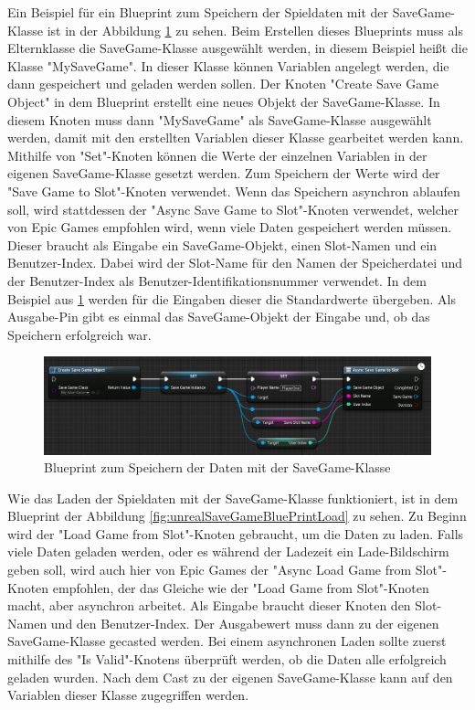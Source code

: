 Ein Beispiel für ein Blueprint zum Speichern der Spieldaten mit der SaveGame-Klasse ist in der Abbildung \ref{fig:unrealSaveGameBluePrintSave} zu sehen. Beim Erstellen dieses Blueprints muss als Elternklasse die SaveGame-Klasse ausgewählt werden, in diesem Beispiel heißt die Klasse "MySaveGame". In dieser Klasse können Variablen angelegt werden, die dann gespeichert und geladen werden sollen. Der Knoten "Create Save Game Object" in dem Blueprint erstellt eine neues Objekt der SaveGame-Klasse. In diesem Knoten muss dann "MySaveGame" als SaveGame-Klasse ausgewählt werden, damit mit den erstellten Variablen dieser Klasse gearbeitet werden kann. Mithilfe von "Set"-Knoten können die Werte der einzelnen Variablen in der eigenen SaveGame-Klasse gesetzt werden. Zum Speichern der Werte wird der "Save Game to Slot"-Knoten verwendet. Wenn das Speichern asynchron ablaufen soll, wird stattdessen der "Async Save Game to Slot"-Knoten verwendet, welcher von Epic Games empfohlen wird, wenn viele Daten gespeichert werden müssen. Dieser braucht als Eingabe ein SaveGame-Objekt, einen Slot-Namen und ein Benutzer-Index. Dabei wird der Slot-Name für den Namen der Speicherdatei und der Benutzer-Index als Benutzer-Identifikationsnummer verwendet. In dem Beispiel aus \ref{fig:unrealSaveGameBluePrintSave} werden für die Eingaben dieser die Standardwerte übergeben. Als Ausgabe-Pin gibt es einmal das SaveGame-Objekt der Eingabe und, ob das Speichern erfolgreich war.\cite{unrealengineSavingLoading}

\begin{figure}[htp]
    \centering
    \includegraphics[width=1\textwidth]{images/SaveGameBP.png}
    \caption{Blueprint zum Speichern der Daten mit der SaveGame-Klasse\cite{unrealengineSavingLoading}}
    \label{fig:unrealSaveGameBluePrintSave}
\end{figure}

Wie das Laden der Spieldaten mit der SaveGame-Klasse funktioniert, ist in dem Blueprint der Abbildung \ref{fig:unrealSaveGameBluePrintLoad} zu sehen. Zu Beginn wird der "Load Game from Slot"-Knoten gebraucht, um die Daten zu laden. Falls viele Daten geladen werden, oder es während der Ladezeit ein Lade-Bildschirm geben soll, wird auch hier von Epic Games der "Async Load Game from Slot"-Knoten empfohlen, der das Gleiche wie der "Load Game from Slot"-Knoten macht, aber asynchron arbeitet. Als Eingabe braucht dieser Knoten den Slot-Namen und den Benutzer-Index. Der Ausgabewert muss dann zu der eigenen SaveGame-Klasse gecasted werden. Bei einem asynchronen Laden sollte zuerst mithilfe des "Is Valid"-Knotens überprüft werden, ob die Daten alle erfolgreich geladen wurden. Nach dem Cast zu der eigenen SaveGame-Klasse kann auf den Variablen dieser Klasse zugegriffen werden.\cite{unrealengineSavingLoading}

